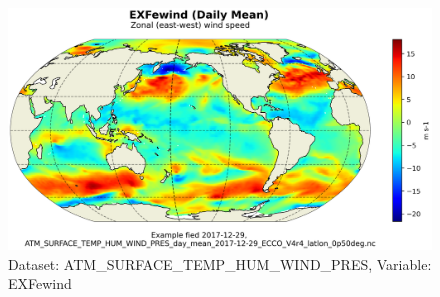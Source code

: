 \begin{figure}[H]
\centering
\includegraphics[scale=0.55]{../images/plots/latlon_plots/Atmosphere_Surface_Temperature_Humidity_Wind_and_Pressure/EXFewind.png}
\caption{Dataset: ATM\_SURFACE\_TEMP\_HUM\_WIND\_PRES, Variable: EXFewind}
\label{tab:table-ATM_SURFACE_TEMP_HUM_WIND_PRES_EXFewind-Plot}
\end{figure}
\pagebreak
